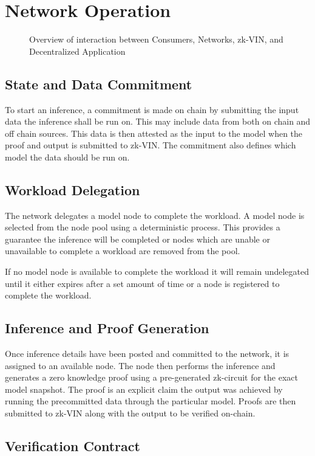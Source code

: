 \documentclass[conference]{IEEEtran}
\begin{document}
\section{Network Operation}
\begin{figure}[!ht]
    \centering
    
    \caption{Overview of interaction between Consumers, Networks, zk-VIN, and Decentralized Application}
    \label{fig:Fig 8}
\end{figure}
\subsection{State and Data Commitment}
To start an inference, a commitment is made on chain by submitting the input data the inference shall be run on. This may include data from both on chain and off chain sources. This data is then attested as the input to the model when the proof and output is submitted to zk-VIN. The commitment also defines which model the data should be run on.

\subsection{Workload Delegation}
The network delegates a model node to complete the workload. A model node is selected from the node pool using a deterministic process. This provides a guarantee the inference will be completed or nodes which are unable or unavailable to complete a workload are removed from the pool.

If no model node is available to complete the workload it will remain undelegated until it either expires after a set amount of time or a node is registered to complete the workload.

\subsection{Inference and Proof Generation}
Once inference details have been posted and committed to the network, it is assigned to an available node. The node then performs the inference and generates a zero knowledge proof using a pre-generated zk-circuit for the exact model snapshot. The proof is an explicit claim the output was achieved by running the precommitted data through the particular model. Proofs are then submitted to zk-VIN along with the output to be verified on-chain.

\subsection{Verification Contract}
\end{document}
